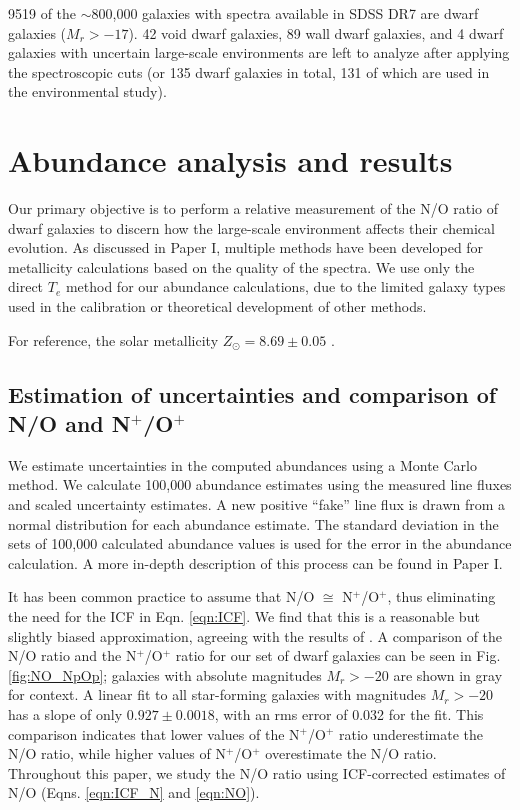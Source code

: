 9519 of the $\sim$800,000 galaxies with spectra available in SDSS DR7 are dwarf 
galaxies ($M_r > -17$).  42 void dwarf galaxies, 89 wall dwarf galaxies, and 4 
dwarf galaxies with uncertain large-scale environments are left to analyze after 
applying the spectroscopic cuts (or 135 dwarf galaxies in total, 131 of which 
are used in the environmental study).


%
%
\section[Results]{Abundance analysis and results}

Our primary objective is to perform a relative measurement of the N/O ratio of 
dwarf galaxies to discern how the large-scale environment affects their chemical 
evolution.  As discussed in Paper I, multiple methods have been developed for 
metallicity calculations based on the quality of the spectra.  We use only the 
direct $T_e$ method for our abundance calculations, due to the limited galaxy 
types used in the calibration or theoretical development of other methods.

For reference, the solar metallicity $Z_{\odot} = 8.69\pm 0.05$ 
\citep{Asplund09}.


\subsection{Estimation of uncertainties and comparison of N/O and N$^+$/O$^+$}

We estimate uncertainties in the computed abundances using a Monte Carlo method.  
We calculate 100,000 abundance estimates using the measured line fluxes and 
scaled uncertainty estimates.  A new positive ``fake'' line flux is drawn from a 
normal distribution for each abundance estimate.  The standard deviation in 
the sets of 100,000 calculated abundance values is used for the error in the 
abundance calculation.  A more in-depth description of this process can be found 
in Paper I.

It has been common practice to assume that N/O $\cong$ N$^+$/O$^+$, thus 
eliminating the need for the ICF in Eqn. \ref{eqn:ICF}.  We find that this is a 
reasonable but slightly biased approximation, agreeing with the results of 
\cite{Nava06}.  A comparison of the N/O ratio and the N$^+$/O$^+$ ratio for our 
set of dwarf galaxies can be seen in Fig. \ref{fig:NO_NpOp}; galaxies with 
absolute magnitudes $M_r > -20$ are shown in gray for context.  A linear fit to 
all star-forming galaxies with magnitudes $M_r > -20$ has a slope of only 
$0.927\pm 0.0018$, with an rms error of 0.032 for the fit.  This comparison 
indicates that lower values of the N$^+$/O$^+$ ratio underestimate the N/O 
ratio, while higher values of N$^+$/O$^+$ overestimate the N/O ratio.  
Throughout this paper, we study the N/O ratio using ICF-corrected estimates of 
N/O (Eqns. \ref{eqn:ICF_N} and \ref{eqn:NO}).

